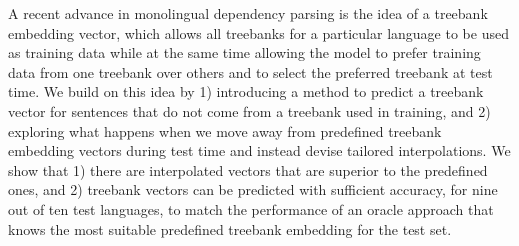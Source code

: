 A recent advance in monolingual dependency parsing is the idea of a treebank embedding vector, which allows all treebanks for a particular language to be used as training data while at the same time allowing the model to prefer training data from one treebank over others and to select the preferred treebank at test time. We build on this idea by 1) introducing a method to predict a treebank vector for sentences that do not come from a treebank used in training, and 2) exploring what happens when we move away from predefined treebank embedding vectors during test time and instead devise tailored interpolations. We show that 1) there are interpolated vectors that are superior to the predefined ones, and 2) treebank vectors can be predicted with sufficient accuracy, for nine out of ten test languages, to match the performance of an oracle approach that knows the most suitable predefined treebank embedding for the test set.
